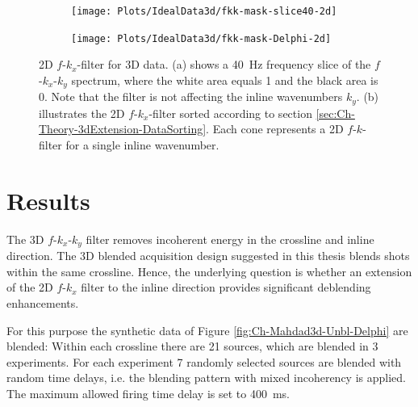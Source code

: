 \begin{figure}

	\centering 
	\begin{subfigure}[t]{0.45\textwidth}
		\centering
		\texttt{[image: Plots/IdealData3d/fkk-mask-slice40-2d]}
		\caption{}
		\label{fig:Ch-Mahdad3d-2dfk-slice}
	\end{subfigure}
	
	\par\bigskip
	
	\centering
	\begin{subfigure}[t]{\textwidth}
		\centering
		\texttt{[image: Plots/IdealData3d/fkk-mask-Delphi-2d]}
		\caption{}
		\label{fig:Ch-Mahdad3d-2dfk-Delphi}
	\end{subfigure}
	
	\caption{2D $f$-$k_x$-filter for 3D data. (a) shows a \SI{40}{\hertz} frequency slice of the $f$-$k_x$-$k_y$ spectrum, where the white area equals 1 and the black area is 0. Note that the filter is not affecting the inline wavenumbers $k_y$. (b) illustrates the 2D $f$-$k_x$-filter sorted according to section \ref{sec:Ch-Theory-3dExtension-DataSorting}. Each cone represents a 2D $f$-$k$-filter for a single inline wavenumber.}
	\label{fig:Ch-Mahdad3d-2dfk}
\end{figure}

\section{Results}

The 3D $f$-$k_x$-$k_y$ filter removes incoherent energy in the crossline and inline direction. The 3D blended acquisition design suggested in this thesis blends shots within the same crossline. Hence, the underlying question is whether an extension of the 2D $f$-$k_x$ filter to the inline direction provides significant deblending enhancements.

For this purpose the synthetic data of Figure \ref{fig:Ch-Mahdad3d-Unbl-Delphi} are blended: Within each crossline there are 21 sources, which are blended in 3 experiments. For each experiment 7 randomly selected sources are blended with random time delays, i.e. the blending pattern with mixed incoherency is applied. The maximum allowed firing time delay is set to \SI{400}{\milli\second}. 

